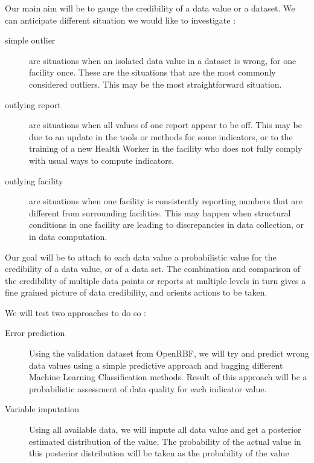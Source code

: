 Our main aim will be to gauge the credibility of a data value or a dataset.  We can anticipate different situation we would like to investigate :
\begin{description}
\item[simple outlier] are situations when an isolated data value in a dataset is wrong, for one facility once. These are the situations that are the most commonly considered outliers. This may be the most straightforward situation.
\item[outlying report] are situations when all values of one report appear to be off. This may be due to an update in the tools or methods for some indicators, or to the training of a new Health Worker in the facility who does not fully comply with usual ways to compute indicators.
\item[outlying facility] are situations when one facility is consistently reporting numbers that are different from surrounding facilities. This may happen when structural conditions in one facility are leading to discrepancies in data collection, or in data computation.
\end{description}

Our goal will be to attach to each data value a probabilistic value for the credibility of a data value, or of a data set. The combination and comparison of the credibility of multiple data points or reports at multiple levels in turn gives a fine grained picture of data credibility, and orients actions to be taken.


We will test two approaches to do so :

\begin{description}
\item[Error prediction] Using the validation dataset from OpenRBF, we will try and predict wrong data values using a simple predictive approach and bagging different Machine Learning Classification methods. Result of this approach will be a probabilistic assessment of data quality for each indicator value.
\item[Variable imputation] Using all available data, we will impute all data value and get a posterior estimated distribution of the value. The probability of the actual value in this posterior distribution will be taken as the probability of the value
\end{description}

